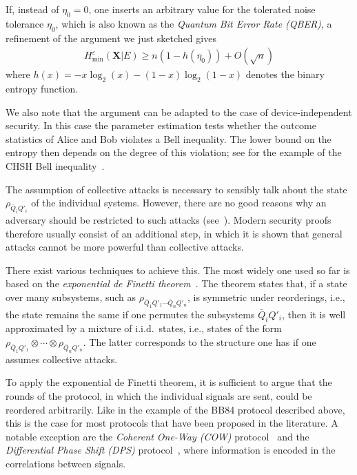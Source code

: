 If, instead of $\eta_0 = 0$, one inserts an arbitrary value for the tolerated noise tolerance $\eta_0$, which is also known as the \emph{Quantum Bit Error Rate (QBER)}, a refinement of the argument we just sketched gives~\cite{RGK05,Ren05}
\begin{align} \label{eq_HminBB84}
  H_{\min}^{\varepsilon}(\mathbf{X}|E) \geq n (1-h(\eta_0)) + O(\sqrt{n})
\end{align}
where $h(x) = -x\log_2(x) -(1-x)\log_2(1-x)$ denotes the binary entropy function. 

We also note that the argument can be adapted to the case of device-independent security. In this case  the parameter estimation tests whether the outcome statistics of Alice and Bob violates a Bell inequality. The lower bound on the entropy then depends on the degree of this violation; see \textcite{ABGMPS07} for the example of the CHSH Bell inequality~\cite{CHSH69}.

The assumption of collective attacks is necessary    to sensibly talk about the state $\rho_{\bar{Q}_i Q'_i}$ of the individual systems. However, there are no good reasons why an adversary should be restricted to such attacks (see~). Modern security proofs therefore usually consist of an additional step, in which it is shown that general attacks cannot be more powerful than collective attacks. 

There exist various techniques to achieve this. The most widely one used so far is based on the \emph{exponential de Finetti theorem}~\cite{Ren05,Ren07,RC09}. The theorem states that, if a state over many subsystems, such as $\rho_{\bar{Q}_1 Q'_1 \cdots \bar{Q}_n Q'_n}$, is symmetric under reorderings, i.e., the state remains the same if one permutes the subsystems $\bar{Q}_i Q'_i$, then it is well approximated by a mixture of i.i.d.\ states, i.e., states of the form $\rho_{\bar{Q}_1 Q'_1} \otimes \cdots \otimes \rho_{\bar{Q}_n Q'_n}$. The latter corresponds to the structure one has if one assumes collective attacks. 

To apply the exponential de Finetti theorem, it is sufficient to argue that the rounds of the protocol, in which the individual signals are sent, could be reordered arbitrarily. Like in the example of the BB84 protocol described above, this is the case for most protocols that have been proposed in the literature. A notable exception are the \emph{Coherent One-Way (COW)} protocol~\cite{SBGSZ05} and the \emph{Differential Phase Shift (DPS)} protocol~\cite{IWY02}, where information is encoded in the correlations between signals. 

